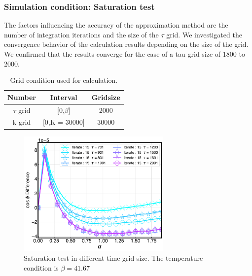\documentclass{article}[12pt]
\numberwithin{equation}{section}
\begin{document}
\begin{spacing}{1.5}
\subsubsection*{Simulation condition: Saturation test}
The factors influencing the accuracy of the approximation method are the number of integration iterations and the size of the $\tau$ grid.
We investigated the convergence behavior of the calculation results depending on the size of the grid.
We confirmed that the results converge for the case of a tau grid size of 1800 to 2000. 
\begin{table}
  \centering
  \renewcommand{\arraystretch}{1.2}  %
  \begin{tabular}{@{}ccc@{}}
  \toprule
  \textbf{Number} & \textbf{Interval} & \textbf{Gridsize}\\ 
  \midrule
  $\tau$ grid & [0,$\beta$] & 2000 \\
  k grid & [0,K = 30000] & 30000 \\
  \bottomrule
  \end{tabular}
  \caption{Grid condition used for calculation.}
  \end{table}
\begin{figure}[htbp]
  \centerline{\includegraphics[width=7.5cm]{TexFigure/4/4_2_01_saturation.png}}
  \caption{Saturation test in different time grid size. The temperature condition is $\beta = 41.67$}
\end{figure}
\pagebreak

\end{spacing}
\end{document}
